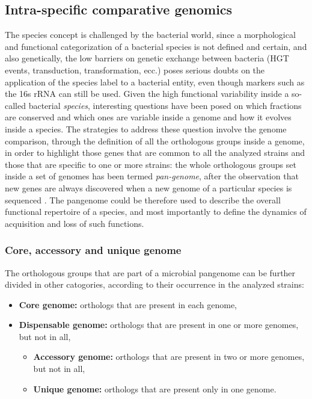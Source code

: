 \subsection{Intra-specific comparative genomics}
The species concept is challenged by the bacterial world, since a morphological and functional categorization of a bacterial species is not defined and certain, and also genetically, the low barriers on genetic exchange between bacteria (HGT events, transduction, transformation, ecc.) poses serious doubts on the application of the species label to a bacterial entity, even though markers such as the 16s rRNA can still be used. Given the high functional variability inside a so-called bacterial \textit{species}, interesting questions have been posed on which fractions are conserved and which ones are variable inside a genome and how it evolves inside a species. The strategies to address these question involve the genome comparison, through the definition of all the orthologous groups inside a genome, in order to highlight those genes that are common to all the analyzed strains and those that are specific to one or more strains: the whole orthologous groups set inside a set of genomes has been termed \textit{pan-genome}, after the observation that new genes are always discovered when a new genome of a particular species is sequenced \cite{tettelin2005genome}\cite{medini2005microbial}. The pangenome could be therefore used to describe the overall functional repertoire of a species, and most importantly to define the dynamics of acquisition and loss of such functions.

\subsubsection{Core, accessory and unique genome}
The orthologous groups that are part of a microbial pangenome can be further divided in other catogories, according to their occurrence in the analyzed strains:

\begin{itemize}
\item \textbf{Core genome:} orthologs that are present in each genome,
\item \textbf{Dispensable genome:} orthologs that are present in one or more genomes, but not in all,
	\begin{itemize}
		\item \textbf{Accessory genome:} orthologs that are present in two or more genomes, but not in all,
		\item \textbf{Unique genome:} orthologs that are present only in one genome.
	\end{itemize}
\end{itemize}

